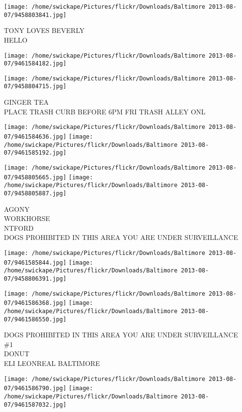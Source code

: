 \documentclass[10pt,letterpaper]{article}
\begin{document}
\vspace{0.25in}
\texttt{[image: /home/swickape/Pictures/flickr/Downloads/Baltimore 2013-08-07/9458803841.jpg]}

TONY LOVES BEVERLY\\
HELLO\\
\pagebreak

\texttt{[image: /home/swickape/Pictures/flickr/Downloads/Baltimore 2013-08-07/9461584182.jpg]}

\vspace{0.25in}
\texttt{[image: /home/swickape/Pictures/flickr/Downloads/Baltimore 2013-08-07/9458804715.jpg]}

GINGER TEA\\
PLACE TRASH CURB BEFORE 6PM FRI TRASH ALLEY ONL\\
\pagebreak

\texttt{[image: /home/swickape/Pictures/flickr/Downloads/Baltimore 2013-08-07/9461584636.jpg]}
\texttt{[image: /home/swickape/Pictures/flickr/Downloads/Baltimore 2013-08-07/9461585192.jpg]}

\texttt{[image: /home/swickape/Pictures/flickr/Downloads/Baltimore 2013-08-07/9458805665.jpg]}
\texttt{[image: /home/swickape/Pictures/flickr/Downloads/Baltimore 2013-08-07/9458805887.jpg]}

AGONY\\
WORKHORSE\\
NTFORD\\
DOGS PROHIBITED IN THIS AREA YOU ARE UNDER SURVEILLANCE\\
\pagebreak

\texttt{[image: /home/swickape/Pictures/flickr/Downloads/Baltimore 2013-08-07/9461585844.jpg]}
\texttt{[image: /home/swickape/Pictures/flickr/Downloads/Baltimore 2013-08-07/9458806391.jpg]}

\texttt{[image: /home/swickape/Pictures/flickr/Downloads/Baltimore 2013-08-07/9461586368.jpg]}
\texttt{[image: /home/swickape/Pictures/flickr/Downloads/Baltimore 2013-08-07/9461586550.jpg]}

DOGS PROHIBITED IN THIS AREA YOU ARE UNDER SURVEILLANCE\\
\#1\\
DONUT\\
ELI LEONREAL BALTIMORE\\
\pagebreak

\texttt{[image: /home/swickape/Pictures/flickr/Downloads/Baltimore 2013-08-07/9461586790.jpg]}
\texttt{[image: /home/swickape/Pictures/flickr/Downloads/Baltimore 2013-08-07/9461587032.jpg]}
\end{document}

